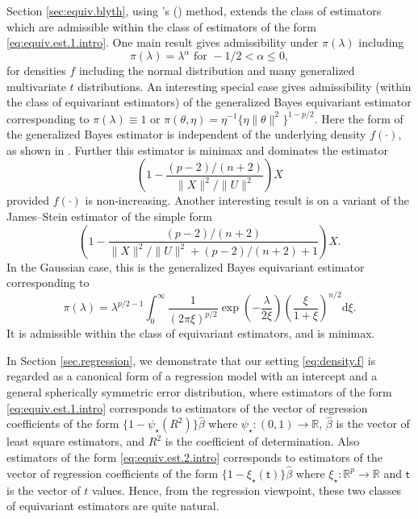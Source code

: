 \documentclass[preprint,11pt]{imsart}
\numberwithin{equation}{section}
\theoremstyle{plain}
\theoremstyle{definition}
\theoremstyle{remark}
\def\citeapos#1{\citeauthor{#1}'s (\citeyear{#1})}
\newcommand{\rd}{\mathrm{d}}
\begin{document}
Section \ref{sec:equiv.blyth}, using \citeapos{Blyth-1951} method,
extends the class of estimators which are admissible within the class of 
estimators of the form \eqref{eq:equiv.est.1.intro}.
One main result gives admissibility under $\pi(\lambda)$ including
\begin{equation*}
 \pi(\lambda)=\lambda^\alpha \text{ for }-1/2<\alpha\leq 0,
\end{equation*}
for densities $f$ including the normal distribution
and many generalized multivariate $t$ distributions.
An interesting special case gives admissibility (within the class of equivariant estimators)
of the generalized Bayes equivariant estimator corresponding to $\pi(\lambda)\equiv 1$
or $\pi(\theta,\eta)=\eta^{-1}\{\eta\|\theta\|^2\}^{1-p/2}$.
Here the form of the generalized Bayes estimator is independent of the underlying
density $f(\cdot)$, as shown in \cite{Maruyama-2003b}. Further this estimator is minimax and dominates
the \cite{James-Stein-1961} estimator
\begin{equation*}
 \left(1-\frac{(p-2)/(n+2)}{\|X\|^2/\|U\|^2}\right)X
\end{equation*}
provided $f(\cdot)$ is non-increasing.
Another interesting result is on a variant of the James--Stein estimator
of the simple form
\begin{equation*}
 \left(1-\frac{(p-2)/(n+2)}{\|X\|^2/\|U\|^2+(p-2)/(n+2)+1}\right)X.
\end{equation*}
In the Gaussian case, this is the generalized Bayes equivariant estimator corresponding to 
\begin{equation*}%
\pi(\lambda)=\lambda^{p/2-1}\int_0^\infty\frac{1}{(2\pi\xi)^{p/2}}\exp\left(-\frac{\lambda}{2\xi}\right)
\left(\frac{\xi}{1+\xi}\right)^{n/2}\rd \xi.
\end{equation*}
It is admissible within the class of equivariant estimators, 
and is minimax. 

In Section \ref{sec.regression}, we demonstrate that
our setting \eqref{eq:density.f} is regarded as a canonical form of a regression model
with an intercept and a general spherically symmetric error distribution,
where estimators of the form \eqref{eq:equiv.est.1.intro}
corresponds to 
estimators of the vector of regression coefficients of the form
$\{1-\psi_\star(R^2)\}\hat{\beta}$ where $\psi_\star:(0,1)\to\mathbb{R}$,
$\hat{\beta}$ is the vector of
least square estimators, and $R^2$ is the coefficient of determination.
Also estimators of the form \eqref{eq:equiv.est.2.intro} corresponds to
estimators of the vector of regression coefficients of the form
$\{1-\xi_\star(\mathsf{t})\}\hat{\beta}$ where $\xi_\star:\mathbb{R}^p\to\mathbb{R}$ and
$\mathsf{t}$ is the vector of $t$ values.
Hence, from the regression viewpoint, these two classes of equivariant estimators
are quite natural.
\end{document}
